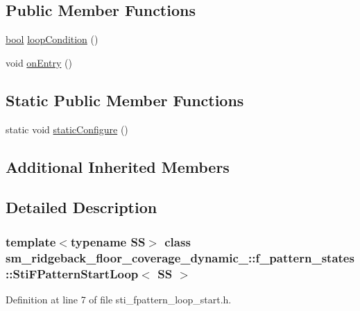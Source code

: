 \subsection*{Public Member Functions}
\begin{DoxyCompactItemize}
\item 
\hyperlink{classbool}{bool} \hyperlink{structsm__ridgeback__floor__coverage__dynamic__1_1_1f__pattern__states_1_1StiFPatternStartLoop_a47c1d55fa4fc153703903a92353e32ac}{loop\+Condition} ()
\item 
void \hyperlink{structsm__ridgeback__floor__coverage__dynamic__1_1_1f__pattern__states_1_1StiFPatternStartLoop_a0125684bbc54b87498fc66d87825ee89}{on\+Entry} ()
\end{DoxyCompactItemize}
\subsection*{Static Public Member Functions}
\begin{DoxyCompactItemize}
\item 
static void \hyperlink{structsm__ridgeback__floor__coverage__dynamic__1_1_1f__pattern__states_1_1StiFPatternStartLoop_ac8d6f4f39364c32cafb39cfe8ec2c939}{static\+Configure} ()
\end{DoxyCompactItemize}
\subsection*{Additional Inherited Members}


\subsection{Detailed Description}
\subsubsection*{template$<$typename SS$>$\newline
class sm\+\_\+ridgeback\+\_\+floor\+\_\+coverage\+\_\+dynamic\+\_\+::f\+\_\+pattern\+\_\+states\+::\+Sti\+F\+Pattern\+Start\+Loop$<$ S\+S $>$}



Definition at line 7 of file sti\+\_\+fpattern\+\_\+loop\+\_\+start.\+h.



